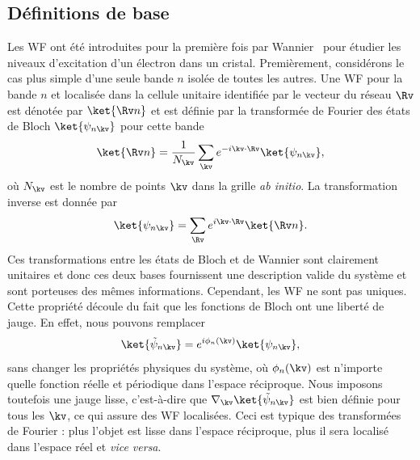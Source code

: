 \subsection{Définitions de base}
Les WF ont été introduites pour la première fois par Wannier~\cite{wannierStructureElectronicExcitation1937} pour étudier les niveaux d'excitation d'un électron dans un cristal. Premièrement, considérons le cas plus simple d'une seule bande $n$ isolée de toutes les autres. Une WF pour la bande $n$ et localisée dans la cellule unitaire identifiée par le vecteur du réseau $\Rv$ est dénotée par $\ket{\Rv n}$ et est définie par la transformée de Fourier des états de Bloch $\ket{\psi_{n\kv}}$ pour cette bande 
\begin{equation}
    \ket{\Rv n} = \frac{1}{N_\kv}\sum_\kv e^{-i\kv\cdot\Rv}\ket{\psi_{n\kv}},
    \label{eqn:c3_wf_1W}
\end{equation}
où $N_\kv$ est le nombre de points $\kv$ dans la grille \textit{ab initio}. La transformation inverse est donnée par
\begin{equation}
    \ket{\psi_{n\kv}}=\sum_\Rv e^{i\kv\cdot\Rv}\ket{\Rv n}.
    \label{eqn:c3_wf_1B}
\end{equation}
Ces transformations entre les états de Bloch et de Wannier sont clairement unitaires et donc ces deux bases fournissent une description valide du système et sont porteuses des mêmes informations. Cependant, les WF ne sont pas uniques. Cette propriété découle du fait que les fonctions de Bloch ont une liberté de jauge. En effet, nous pouvons remplacer
\begin{equation}
    \ket{\tilde{\psi}_{n\kv}} = e^{i\phi_n(\kv)}\ket{\psi_{n\kv}},
    \label{eqn:c3_wf_1gauge}
\end{equation}
sans changer les propriétés physiques du système, où $\phi_n(\kv)$ est n'importe quelle fonction réelle et périodique dans l'espace réciproque. Nous imposons toutefois une jauge lisse, c'est-à-dire que $\nabla_\kv\ket{\tilde{\psi}_{n\kv}}$ est bien définie pour tous les $\kv$, ce qui assure des WF localisées. Ceci est typique des transformées de Fourier : plus l'objet est lisse dans l'espace réciproque, plus il sera localisé dans l'espace réel et \textit{vice versa}.

